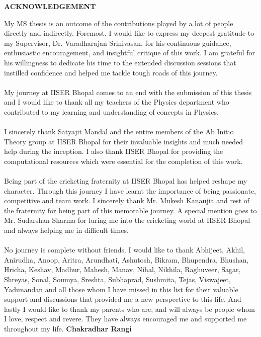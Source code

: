     \newpage
    \begin{center}
        \LARGE{\textbf{\uppercase{Acknowledgement}}}
    \end{center}
    \vspace{1cm}
    My MS thesis is an outcome of the contributions played by a lot of people directly and indirectly. Foremost, I would like to express my deepest gratitude to my Supervisor, Dr. Varadharajan Srinivasan, for his continuous guidance, enthusiastic encouragement, and insightful critique of this work. I am grateful for his willingness to dedicate his time to the extended discussion sessions that instilled confidence and helped me tackle tough roads of this journey. \\ \\
    My journey at IISER Bhopal comes to an end with the submission of this thesis and I would like to thank all my teachers of the Physics department who contributed to my learning and understanding of concepts in Physics. \\ \\ 
    I sincerely thank Satyajit Mandal and the entire members of the Ab Initio Theory group at IISER Bhopal for their invaluable insights and much needed help during the inception. I also thank IISER Bhopal for providing the computational resources which were essential for the completion of this work. \\ \\
    Being part of the cricketing fraternity at IISER Bhopal has helped reshape my character. Through this journey I have learnt the importance of being passionate, competitive and team work. I sincerely thank Mr. Mukesh Kanaujia and rest of the fraternity for being part of this memorable journey. A special mention goes to Mr. Sudarshan Sharma for luring me into the cricketing world at IISER Bhopal and always helping me in difficult times.  \\ \\
    No journey is complete without friends. I would like to thank Abhijeet, Akhil, Anirudha, Anoop, Aritra, Arundhati, Ashutosh, Bikram, Bhupendra, Bhushan, Hricha, Keshav, Madhur, Mahesh, Manav, Nihal, Nikhila, Raghuveer, Sagar, Shreyas, Sonal, Soumya, Sreshta, Subhaprad, Sushmita, Tejas, Viswajeet, Yadunandan and all those whom I have missed in this list for their valuable support and discussions that provided me a new perspective to this life. And lastly I would like to thank my parents who are, and will always be people whom I love, respect and revere. They have always encouraged me and supported me throughout my life.
    \vfill 
    \noindent\textbf{\hfill Chakradhar Rangi}
    
